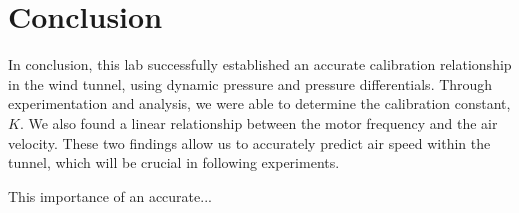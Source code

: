 \chapter{Conclusion}
\label{cp:conclusion}
In conclusion, this lab successfully established an accurate calibration relationship in the wind tunnel, using dynamic pressure and pressure differentials. Through experimentation and analysis, we were able to determine the calibration constant, $K$. We also found a linear relationship between the motor frequency and the air velocity. These two findings allow us to accurately predict air speed within the tunnel, which will be crucial in following experiments.  \par
This importance of an accurate...